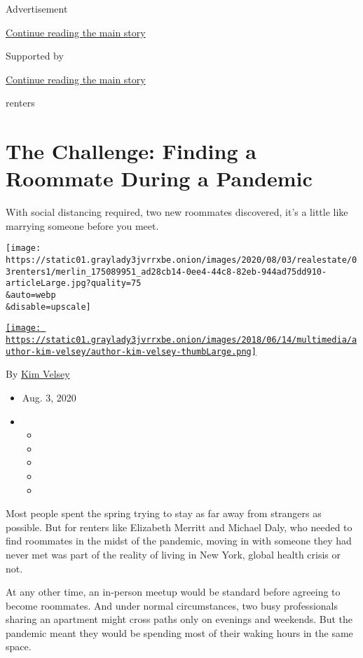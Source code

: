 Advertisement

\protect\hyperlink{after-top}{Continue reading the main story}

Supported by

\protect\hyperlink{after-sponsor}{Continue reading the main story}

renters

\hypertarget{the-challenge-finding-a-roommate-during-a-pandemic}{%
\section{The Challenge: Finding a Roommate During a
Pandemic}\label{the-challenge-finding-a-roommate-during-a-pandemic}}

With social distancing required, two new roommates discovered, it's a
little like marrying someone before you meet.

\texttt{[image: https://static01.graylady3jvrrxbe.onion/images/2020/08/03/realestate/03renters1/merlin\_175089951\_ad28cb14-0ee4-44c8-82eb-944ad75dd910-articleLarge.jpg?quality=75\\\&auto=webp\\\&disable=upscale]}

\href{https://www.nytimes3xbfgragh.onion/by/kim-velsey}{\texttt{[image: https://static01.graylady3jvrrxbe.onion/images/2018/06/14/multimedia/author-kim-velsey/author-kim-velsey-thumbLarge.png]}}

By \href{https://www.nytimes3xbfgragh.onion/by/kim-velsey}{Kim Velsey}

\begin{itemize}
\item
  Aug. 3, 2020
\item
  \begin{itemize}
  \item
  \item
  \item
  \item
  \item
  \end{itemize}
\end{itemize}

Most people spent the spring trying to stay as far away from strangers
as possible. But for renters like Elizabeth Merritt and Michael Daly,
who needed to find roommates in the midst of the pandemic, moving in
with someone they had never met was part of the reality of living in New
York, global health crisis or not.

At any other time, an in-person meetup would be standard before agreeing
to become roommates. And under normal circumstances, two busy
professionals sharing an apartment might cross paths only on evenings
and weekends. But the pandemic meant they would be spending most of
their waking hours in the same space.

